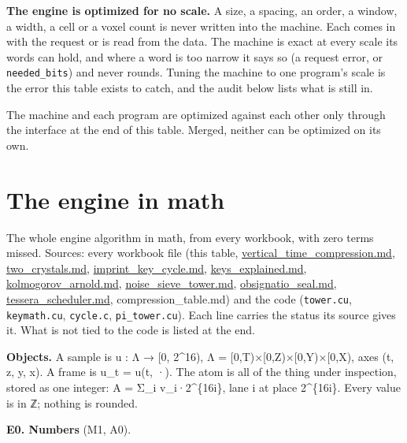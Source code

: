 \textbf{The engine is optimized for no scale.} A size, a spacing, an order, a window, a width, a cell or a voxel count is never written into the machine. Each comes in with the request or is read from the data. The machine is exact at every scale its words can hold, and where a word is too narrow it says so (a request error, or \texttt{needed\_\allowbreak{}bits}) and never rounds. Tuning the machine to one program's scale is the error this table exists to catch, and the audit below lists what is still in.

The machine and each program are optimized against each other only through the interface at the end of this table. Merged, neither can be optimized on its own.

\section{\texorpdfstring{The engine in math}{The engine in math}}

The whole engine algorithm in math, from every workbook, with zero terms missed. Sources: every workbook file (this table, \hyperref[chap:vertical-time-compression]{vertical\_\allowbreak{}time\_\allowbreak{}compression.md}, \hyperref[chap:two-crystals]{two\_\allowbreak{}crystals.md}, \hyperref[chap:imprint-key-cycle]{imprint\_\allowbreak{}key\_\allowbreak{}cycle.md}, \hyperref[chap:keys-explained]{keys\_\allowbreak{}explained.md}, \hyperref[chap:kolmogorov-arnold]{kolmogorov\_\allowbreak{}arnold.md}, \hyperref[chap:noise-sieve-tower]{noise\_\allowbreak{}sieve\_\allowbreak{}tower.md}, \hyperref[chap:obsignatio-seal]{obsignatio\_\allowbreak{}seal.md}, \hyperref[chap:tessera-scheduler]{tessera\_\allowbreak{}scheduler.md}, compression\_\allowbreak{}table.md) and the code (\texttt{tower.\allowbreak{}cu}, \texttt{keymath.\allowbreak{}cu}, \texttt{cycle.\allowbreak{}c}, \texttt{pi\_\allowbreak{}tower.\allowbreak{}cu}). Each line carries the status its source gives it. What is not tied to the code is listed at the end.

\textbf{Objects.} A sample is u : Λ → [0, 2\textasciicircum{}16), Λ = [0,T)×[0,Z)×[0,Y)×[0,X), axes (t, z, y, x). A frame is u\_\allowbreak{}t = u(t, ·). The atom is all of the thing under inspection, stored as one integer: A = Σ\_\allowbreak{}i v\_\allowbreak{}i·2\textasciicircum{}\{16i\}, lane i at place 2\textasciicircum{}\{16i\}. Every value is in ℤ; nothing is rounded.

\textbf{E0. Numbers} (M1, A0).

